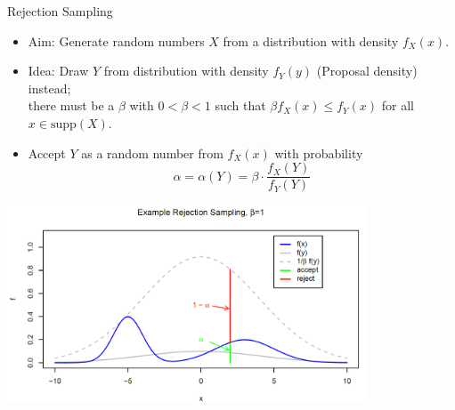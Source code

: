 








\begin{vbframe}{Rejection Sampling}
\begin{itemize}
\item Aim: Generate random numbers $X$ from a distribution with density $f_X(x)$.
\item Idea: Draw $Y$ from distribution with density $f_Y(y)$ (Proposal density) instead; \\
 there must be a $\beta$ with $0 < \beta < 1$ such that $\beta f_X(x) \leq f_Y(x)$ for all
  $x \in \mbox{supp}(X)$.
\item Accept $Y$ as a random number from $f_X(x)$ with probability
  $$
  \alpha = \alpha(Y) = \beta \cdot \frac{f_X(Y)}{f_Y(Y)}
  $$
\end{itemize}

\framebreak


\begin{center}
\includegraphics[width =0.8\textwidth]{figure_man/rejection.png}
\end{center}






\end{vbframe}
